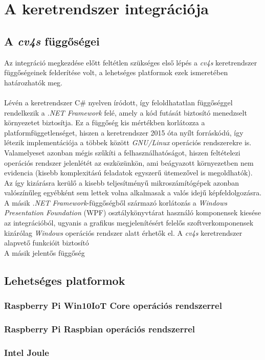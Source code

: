 \chapter{A keretrendszer integrációja}

\section{A \emph{cv4s} függőségei}

Az integráció megkezdése előtt feltétlen szükséges első lépés a \emph{cv4s} keretrendszer függőségeinek felderítése volt, a lehetséges platformok ezek ismeretében határozhatók meg. \\
\\
Lévén a keretrendszer C\# nyelven íródott, így feloldhatatlan függőséggel rendelkezik a \textit{.NET Framework} felé, amely a kód futását biztosító menedzselt környezetet biztosítja. Ez a függőség kis mértékben korlátozza a platformfüggetlenséget, hiszen a keretrendszer 2015 óta nyílt forráskódú, így létezik implementációja a többek között \emph{GNU/Linux} operációs rendszerekre is. Valamelyeset azonban mégis szűkíti a felhasználhatóságot, hiszen feltételezi operációs rendszer jelenlétét az eszközünkön, ami beágyazott környezetben nem evidencia (kisebb komplexitású feladatok egyszerű ütemezővel is megoldhatók). Az így kizárásra kerülő a kisebb teljesítményű mikroszámítógépek azonban valószínűleg egyébként sem lettek volna alkalmasak a valós idejű képfeldolgozásra. \\
A másik \emph{.NET Framework}-függőségből származó korlátozás a \textit{Windows Presentation Foundation} (WPF) osztálykönyvtárat használó komponensek kiesése az integrációból, ugyanis a grafikus megjelenítésért felelős szoftverkomponensek kizárólag \textit{Windows} operációs rendszer alatt érhetők el. A \emph{cv4s} keretrendszer alapvető funkcióit biztosító 
\\
A másik jelentős függőség 

\section{Lehetséges platformok}

\subsection{Raspberry Pi Win10IoT Core operációs rendszerrel}

\subsection{Raspberry Pi Raspbian operációs rendszerrel}

\subsection{Intel Joule}